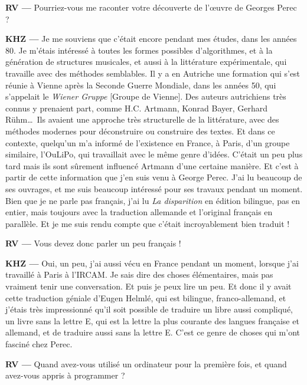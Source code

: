 \documentclass[a4paper,12pt]{article}
\begin{document}
\textbf{RV ---} Pourriez-vous me raconter votre découverte de l'œuvre de Georges Perec ?

\textbf{KHZ ---} Je me souviens que c'était encore pendant mes études, dans les années 80. Je m'étais intéressé à toutes les formes possibles d'algorithmes, et à la génération de structures musicales, et aussi à la littérature expérimentale, qui travaille avec des méthodes semblables. Il y a en Autriche une formation qui s'est réunie à Vienne après la Seconde Guerre Mondiale, dans les années 50, qui s'appelait le \emph{Wiener Gruppe} [Groupe de Vienne]. Des auteurs autrichiens très connus y prenaient part, comme H.C. Artmann, Konrad Bayer, Gerhard Rühm\dots~Ils avaient une approche très structurelle de la littérature, avec des méthodes modernes pour déconstruire ou construire des textes. Et dans ce contexte, quelqu'un m'a informé de l'existence en France, à Paris, d'un groupe similaire, l'OuLiPo, qui travaillait avec le même genre d'idées. C'était un peu plus tard mais ils sont sûrement influencé Artmann d'une certaine manière. Et c'est à partir de cette information que j'en suis venu à George Perec. J'ai lu beaucoup de ses ouvrages, et me suis beaucoup intéressé pour ses travaux pendant un moment. Bien que je ne parle pas français, j'ai lu \emph{La disparition} en édition bilingue, pas en entier, mais toujours avec la traduction allemande et l'original français en parallèle. Et je me suis rendu compte que c'était incroyablement bien traduit !

\textbf{RV ---} Vous devez donc parler un peu français !

\textbf{KHZ ---} Oui, un peu, j'ai aussi vécu en France pendant un moment, lorsque j'ai travaillé à Paris à l'IRCAM. Je sais dire des choses élémentaires, mais pas vraiment tenir une conversation. Et puis je peux lire un peu. Et donc il y avait cette traduction géniale d'Eugen Helmlé, qui est bilingue, franco-allemand, et j'étais très impressionné qu'il soit possible de traduire un libre aussi compliqué, un livre sans la lettre E, qui est la lettre la plus courante des langues française et allemand, et de traduire aussi sans la lettre E. C'est ce genre de choses qui m'ont fasciné chez Perec.

\textbf{RV ---} Quand avez-vous utilisé un ordinateur pour la première fois, et quand avez-vous appris à programmer ?
\end{document}
